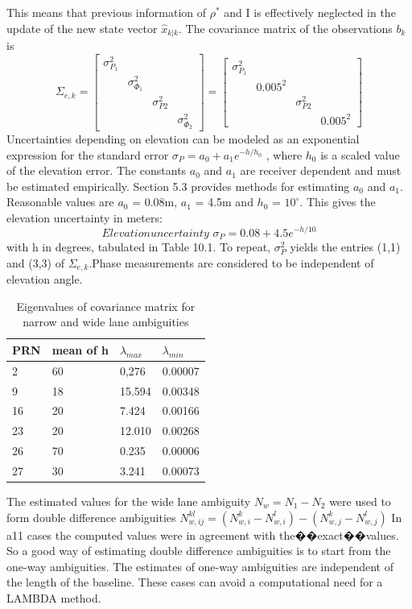 This means that previous information of $\rho^{*}$ and I is effectively neglected in the update of the new state vector $\hat{x}_{k|k}$. The covariance matrix of the observations $b_{k}$ is
\begin{equation}
\Sigma_{e,k}=
\begin{bmatrix}
\sigma_{P_{1}}^{2}\\
&\sigma_{\Phi_{1}}^{2}\\
&&\sigma_{P{2}}^{2}\\
&&&\sigma_{\Phi_{2}}^{2}
\end{bmatrix}
=
\begin{bmatrix}
\sigma_{P_{1}}^{2}\\
&0.005^{2}\\
&&\sigma_{P{2}}^{2}\\
&&&0.005^{2}
\end{bmatrix}
\end{equation}
Uncertainties depending on elevation can be modeled as an exponential expression for the standard error $\sigma_{P}=a_{0}+a_{1}e^{-h/h_{0}}$ , where $h_{0}$ is a scaled value of the elevation error. The constants $a_{0}$ and $a_{1}$ are receiver dependent and must be estimated empirically. Section 5.3 provides methods for estimating $a_{0}$ and $a_{1}$. Reasonable values are $a_{0}$ = 0.08m, $a_{1}$ = 4.5m and $h_{0}$ = $10^{\circ}$. This gives the elevation uncertainty in meters:
$$
Elevation uncertainty \,\, \sigma_{P}=0.08+4.5e^{-h/10}
$$
with h in degrees, tabulated in Table 10.1. To repeat, $\sigma_{P}^{2}$ yields the entries (1,1) and (3,3) of $\Sigma_{e,k}$.Phase measurements are considered to be independent of elevation angle.
\begin{table}[htbp]
	\caption{Eigenvalues of covariance matrix for narrow and wide lane ambiguities}
	\begin{tabular}{llll}
		\hline
		PRN & mean of h & $\lambda_{max}$ & $\lambda_{min}$ \\
		\hline
		2 & 60 & 0,276 & 0.00007\\
		9 & 18 & 15.594 & 0.00348\\
		16 & 20& 7.424 &0.00166 \\
		23&20&12.010&0.00268 \\
		26&70&0.235&0.00006\\
		27&30&3.241&0.00073\\
		\hline
	\end{tabular}
\end{table}

The estimated values for the wide lane ambiguity $N_{w}=N_{1}-N_{2}$ were used to form double difference ambiguities $N_{w,ij}^{kl}=(N_{w,i}^{k}-N_{w,i}^{l})-(N_{w,j}^{k}-N_{w,j}^{l})$ In a11 cases the computed values were in agreement with the��exact��values. So a good way of estimating double difference ambiguities is to start from the one-way ambiguities. The estimates of one-way ambiguities are independent of the length of the baseline. These cases can avoid a computational need for a LAMBDA method.

